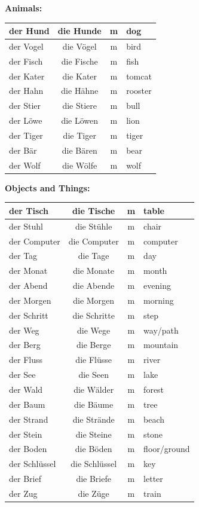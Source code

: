 \bigskip
\noindent\textbf{Animals:}

\begin{center}
\begin{tabular}{|l|c|c|l|}
\hline
der Hund & die Hunde & m & dog \\ \hline
der Vogel & die Vögel & m & bird \\ \hline
der Fisch & die Fische & m & fish \\ \hline
der Kater & die Kater & m & tomcat \\ \hline
der Hahn & die Hähne & m & rooster \\ \hline
der Stier & die Stiere & m & bull \\ \hline
der Löwe & die Löwen & m & lion \\ \hline
der Tiger & die Tiger & m & tiger \\ \hline
der Bär & die Bären & m & bear \\ \hline
der Wolf & die Wölfe & m & wolf \\ \hline
\end{tabular}
\end{center}

\bigskip
\noindent\textbf{Objects and Things:}

\begin{center}
\begin{tabular}{|l|c|c|l|}
\hline
der Tisch & die Tische & m & table \\ \hline
der Stuhl & die Stühle & m & chair \\ \hline
der Computer & die Computer & m & computer \\ \hline
der Tag & die Tage & m & day \\ \hline
der Monat & die Monate & m & month \\ \hline
der Abend & die Abende & m & evening \\ \hline
der Morgen & die Morgen & m & morning \\ \hline
der Schritt & die Schritte & m & step \\ \hline
der Weg & die Wege & m & way/path \\ \hline
der Berg & die Berge & m & mountain \\ \hline
der Fluss & die Flüsse & m & river \\ \hline
der See & die Seen & m & lake \\ \hline
der Wald & die Wälder & m & forest \\ \hline
der Baum & die Bäume & m & tree \\ \hline
der Strand & die Strände & m & beach \\ \hline
der Stein & die Steine & m & stone \\ \hline
der Boden & die Böden & m & floor/ground \\ \hline
der Schlüssel & die Schlüssel & m & key \\ \hline
der Brief & die Briefe & m & letter \\ \hline
der Zug & die Züge & m & train \\ \hline
\end{tabular}
\end{center}

